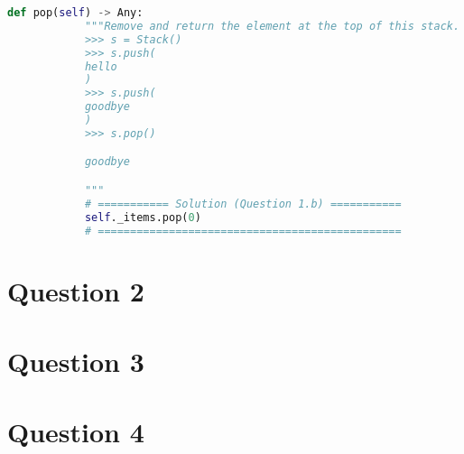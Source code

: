 \documentclass[12pt]{article}
\begin{document}
\begin{enumerate}[a.]
\begin{lstlisting}[language=Python,caption={worksheet\_10\_q1b\_solution.py},captionpos=b]
        def pop(self) -> Any:
            """Remove and return the element at the top of this stack.
            >>> s = Stack()
            >>> s.push(
            hello
            )
            >>> s.push(
            goodbye
            )
            >>> s.pop()

            goodbye

            """
            # =========== Solution (Question 1.b) ===========
            self._items.pop(0)
            # ===============================================
    \end{lstlisting}

\end{enumerate}

\section*{Question 2}

\section*{Question 3}

\section*{Question 4}
\end{document}
